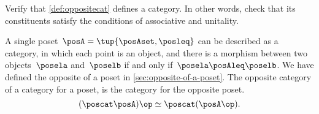 \vfill
\begin{gradedexercise}
    \label{ex:OppositeCat}
    Verify that \cref{def:oppositecat} defines a category.
    In other words, check that its constituents satisfy the conditions of associative and unitality.
\end{gradedexercise}


\begin{example}
    A single poset~$\posA=\tup{\posAset, \posleq}$ can be described as a category, in which each point is an object, and there is a morphism between two objects~$\posela$ and~$\poselb$ if and only if~$\posela \posAleq \poselb$.
    We have defined the opposite of a poset in \cref{sec:opposite-of-a-poset}.
    The opposite category of a category for a poset, is the category for the opposite poset.
    \begin{equation}
        (\poscat \posA)\op \simeq \poscat (\posA\op) .
    \end{equation}
\end{example}
